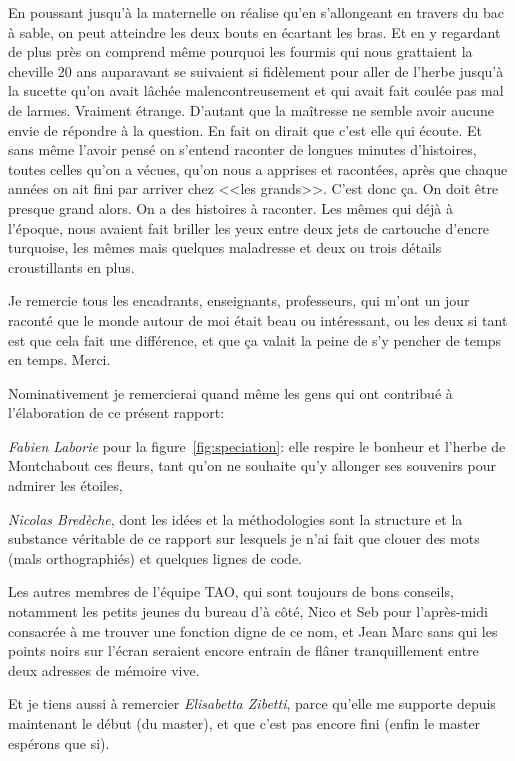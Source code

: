 \documentclass[a4paper,10pt]{report}
\begin{document}
\begin{itshape}
		En poussant jusqu'à la maternelle on réalise qu'en s'allongeant en travers du bac à sable, on peut atteindre les deux bouts en écartant les bras. Et en y regardant de plus près on comprend même pourquoi les fourmis qui nous grattaient la cheville 20 ans auparavant se suivaient si fidèlement pour aller de l'herbe jusqu'à la sucette qu'on avait lâchée malencontreusement et qui avait fait coulée pas mal de larmes. Vraiment étrange. D'autant que la maîtresse ne semble avoir aucune envie de répondre à la question. En fait on dirait que c'est elle qui écoute. Et sans même l'avoir pensé on s'entend raconter de longues minutes d'histoires, toutes celles qu'on a vécues, qu'on nous a apprises et racontées, après que chaque années on ait fini par arriver chez <<les grands>>. C'est donc ça. On doit être presque grand alors. On a des histoires à raconter. Les mêmes qui déjà à l'époque, nous avaient fait briller les yeux entre deux jets de cartouche d'encre turquoise, les mêmes mais quelques maladresse et deux ou trois  détails croustillants en plus.
		
	
		Je remercie tous les encadrants, enseignants, professeurs, qui m'ont un jour raconté que le monde autour de moi était beau ou intéressant, ou les deux si tant est que cela fait une différence, et que \c ca valait la peine de s'y pencher de temps en temps. Merci.
	
		
		Nominativement je remercierai quand même les gens qui ont contribué à l'élaboration de ce présent rapport: 
	
		\emph{Fabien Laborie} pour la figure~\ref{fig:speciation}: elle respire le bonheur et l'herbe de Montchabout ces fleurs, tant qu'on ne souhaite qu'y allonger ses souvenirs pour admirer les étoiles,
	
		\emph{Nicolas Bredèche}, dont les idées et la méthodologies sont la structure et la substance véritable de ce rapport sur lesquels je n'ai fait que clouer des mots (mals orthographiés) et quelques lignes de code. %
	
		Les autres membres de l'équipe TAO, qui sont toujours de bons conseils, notamment les petits jeunes du bureau d'à côté, Nico et Seb pour l'après-midi consacrée à me trouver une fonction digne de ce nom, et Jean Marc sans qui les points noirs sur l'écran seraient encore entrain de flâner tranquillement entre deux adresses de mémoire vive.
		
		Et je tiens aussi à remercier \emph{Elisabetta Zibetti}, parce qu'elle me supporte depuis maintenant le début (du master), et que c'est pas encore fini (enfin le master espérons que si).
	
		\end{itshape}
	
\end{document}
